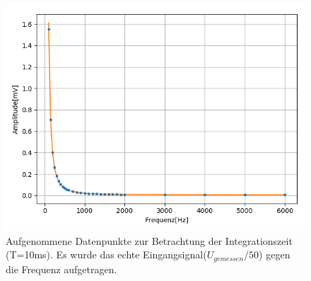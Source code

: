 \documentclass[12pt,a4paper]{article}
\begin{document}
\begin{figure}
\centering
\includegraphics[scale=0.8]{Bilder/Vorversuch4/Vor4_0.png}
\caption{Aufgenommene Datenpunkte zur Betrachtung der Integrationszeit (T=10ms). Es wurde das echte Eingangsignal($U_{gemessen}/50$) gegen die Frequenz aufgetragen.}
\label{fig:Vor4}
\end{figure}
\end{document}
